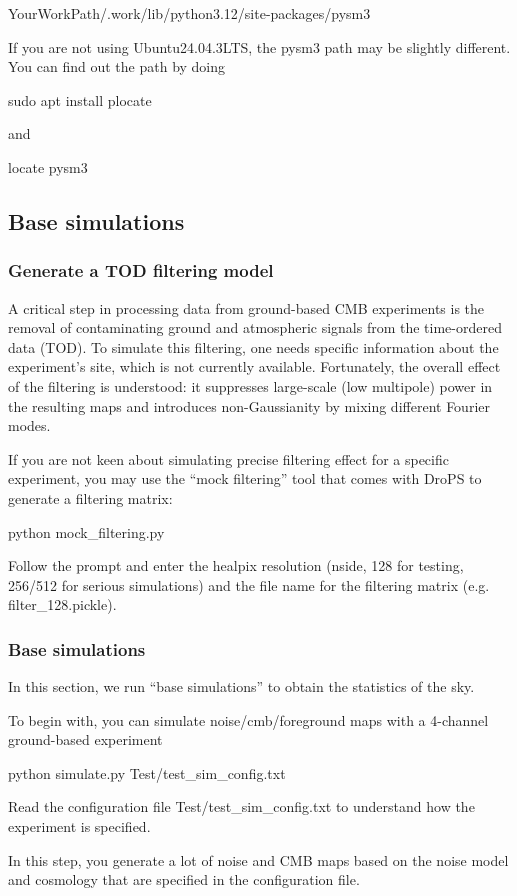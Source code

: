 \documentclass[12pt, a4paper]{ctexart} %
\def\tbox#1{\begin{tcolorbox}#1\end{tcolorbox}}
\begin{document}
YourWorkPath/.work/lib/python3.12/site-packages/pysm3

If you are not using Ubuntu24.04.3LTS, the pysm3 path may be slightly different. You can find out the path by doing
\tbox{sudo apt install plocate}
and
\tbox{locate pysm3}


\subsection{Base simulations}

\subsubsection{Generate a TOD filtering model}

A critical step in processing data from ground-based CMB experiments is the removal of contaminating ground and atmospheric signals from the time-ordered data (TOD). To simulate this filtering, one needs specific information about the experiment's site, which is not currently available. Fortunately, the overall effect of the filtering is understood: it suppresses large-scale (low multipole) power in the resulting maps and introduces non-Gaussianity by mixing different Fourier modes.

If you are not keen about simulating precise filtering effect for a specific experiment, you may use the ``mock filtering'' tool that comes with DroPS to generate a filtering matrix:
\tbox{python mock\_filtering.py}

Follow the prompt and enter the healpix resolution (nside, 128 for testing, 256/512 for serious simulations) and the file name for the filtering matrix (e.g. filter\_128.pickle).


\subsubsection{Base simulations}

In this section, we run ``base simulations'' to obtain the statistics of the sky.

To begin with, you can simulate noise/cmb/foreground maps with a 4-channel ground-based experiment
\tbox{python simulate.py Test/test\_sim\_config.txt}
Read the configuration file Test/test\_sim\_config.txt to understand how the experiment is specified.

In this step, you generate a lot of noise and CMB maps based on the noise model and cosmology that are specified in the configuration file.
\end{document}
